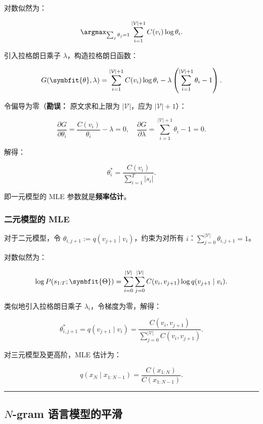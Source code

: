 \documentclass[
  11pt,
  a4paper,
]{article}
\providecommand{\bm}[1]{\symbfit{#1}}
\begin{document}
对数似然为：

\[\argmax_{\sum_j \theta_j = 1} \sum_{i=1}^{|\mathcal{V}|+1} C(v_i) \log \theta_i.\]

引入拉格朗日乘子 \(\lambda\)，构造拉格朗日函数：

\[G(\bm{\theta}, \lambda) = \sum_{i=1}^{|\mathcal{V}|+1} C(v_i) \log \theta_i - \lambda\left(\sum_{i=1}^{|\mathcal{V}|+1} \theta_i - 1\right).\]

令偏导为零（\textbf{勘误：} 原文求和上限为 \(|\mathcal{V}|\)，应为
\(|\mathcal{V}|+1\)）：

\[\frac{\partial G}{\partial \theta_i} = \frac{C(v_i)}{\theta_i} - \lambda = 0, \quad \frac{\partial G}{\partial \lambda} = \sum_{i=1}^{|\mathcal{V}|+1} \theta_i - 1 = 0.\]

解得：

\[\theta_i^* = \frac{C(v_i)}{\sum_{i=1}^T |s_i|}.\]

即一元模型的 MLE 参数就是\textbf{频率估计}。

\subsubsection{二元模型的 MLE}\label{ux4e8cux5143ux6a21ux578bux7684-mle}

对于二元模型，令 \(\theta_{i,j+1} := q(v_{j+1} \mid v_i)\)，约束为对所有
\(i\)：\(\sum_{j=0}^{|\mathcal{V}|} \theta_{i,j+1} = 1\)。

对数似然为：

\[\log P(s_{1:T}; \bm{\Theta}) = \sum_{i=0}^{|\mathcal{V}|} \sum_{j=0}^{|\mathcal{V}|} C(v_i, v_{j+1}) \log q(v_{j+1} \mid v_i).\]

类似地引入拉格朗日乘子 \(\lambda_i\)，令梯度为零，解得：

\[\theta_{i,j+1}^* = q(v_{j+1} \mid v_i) = \frac{C(v_i, v_{j+1})}{\sum_{j=0}^{|\mathcal{V}|} C(v_i, v_{j+1})}.\]

对三元模型及更高阶，MLE 估计为：

\[q(x_N \mid x_{1:N-1}) = \frac{C(x_{1:N})}{C(x_{1:N-1})}.\]

\begin{center}\rule{0.5\linewidth}{0.5pt}\end{center}

\subsection{\texorpdfstring{\(N\)-gram
语言模型的平滑}{N-gram 语言模型的平滑}}\label{n-gram-ux8bedux8a00ux6a21ux578bux7684ux5e73ux6ed1}
\end{document}

